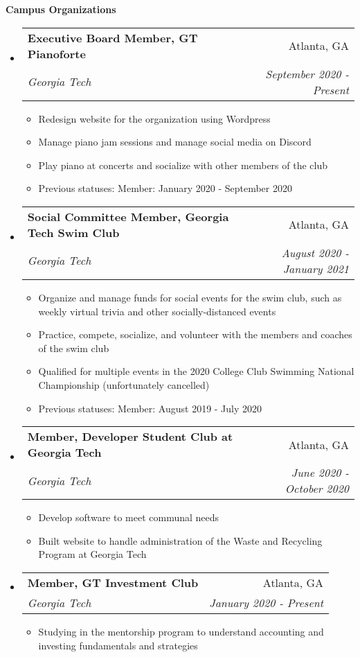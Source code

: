 \documentclass[letterpaper,11pt]{article}
\makeatletter
\newcommand{\resitem}[1]{\item #1 \vspace{-2pt}}
\newcommand{\resheading}[1]{{\large \colorbox{mygrey}{\begin{minipage}{\textwidth}{\textbf{#1 \vphantom{p\^{E}}}}\end{minipage}}}}
\newcommand{\ressubheading}[4]{
\begin{tabular*}{7.0in}{l@{\extracolsep{\fill}}r}
		\textbf{#1} & #2 \\
		\textit{#3} & \textit{#4} \\
\end{tabular*}\vspace{-6pt}}
\makeatother
\begin{document}
\resheading{Campus Organizations}
\begin{itemize}
\item
    \ressubheading{Executive Board Member, GT Pianoforte}{Atlanta, GA}{Georgia Tech}{September 2020 - Present}
    \begin{itemize}
        \resitem{Redesign website for the organization using Wordpress}
        \resitem{Manage piano jam sessions and manage social media on Discord}
        \resitem{Play piano at concerts and socialize with other members of the club}
        \resitem{Previous statuses: Member: January 2020 - September 2020}
    \end{itemize}
\item
    \ressubheading{Social Committee Member, Georgia Tech Swim Club}{Atlanta, GA}{Georgia Tech}{August 2020 - January 2021}
    \begin{itemize}
        \resitem{Organize and manage funds for social events for the swim club, such as weekly virtual trivia and other socially-distanced events}
        \resitem{Practice, compete, socialize, and volunteer with the members and coaches of the swim club}
        \resitem{Qualified for multiple events in the 2020 College Club Swimming National Championship (unfortunately cancelled)}
        \resitem{Previous statuses: Member: August 2019 - July 2020}
    \end{itemize}
\item
    \ressubheading{Member, Developer Student Club at Georgia Tech}{Atlanta, GA}{Georgia Tech}{June 2020 - October 2020}
    \begin{itemize}
        \resitem{Develop software to meet communal needs}
        \resitem{Built website to handle administration of the Waste and Recycling Program at Georgia Tech}
    \end{itemize}
\item
    \ressubheading{Member, GT Investment Club}{Atlanta, GA}{Georgia Tech}{January 2020 - Present}
    \begin{itemize}
        \resitem{Studying in the mentorship program to understand accounting and investing fundamentals and strategies}
    \end{itemize}
\end{itemize}

\end{document}
